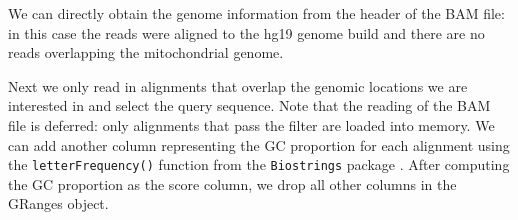\documentclass[]{article}
\newenvironment{Shaded}{\begin{snugshade}}{\end{snugshade}}
\newcommand{\DataTypeTok}[1]{\textcolor[rgb]{0.13,0.29,0.53}{#1}}
\newcommand{\KeywordTok}[1]{\textcolor[rgb]{0.13,0.29,0.53}{\textbf{#1}}}
\newcommand{\NormalTok}[1]{#1}
\newcommand{\OperatorTok}[1]{\textcolor[rgb]{0.81,0.36,0.00}{\textbf{#1}}}
\newcommand{\OtherTok}[1]{\textcolor[rgb]{0.56,0.35,0.01}{#1}}
\newcommand{\StringTok}[1]{\textcolor[rgb]{0.31,0.60,0.02}{#1}}
\begin{document}
We can directly obtain the genome information from the header of the BAM
file: in this case the reads were aligned to the hg19 genome build and
there are no reads overlapping the mitochondrial genome.

\begin{Shaded}
\end{Shaded}

Next we only read in alignments that overlap the genomic locations we
are interested in and select the query sequence. Note that the reading
of the BAM file is deferred: only alignments that pass the filter are
loaded into memory. We can add another column representing the GC
proportion for each alignment using the \texttt{letterFrequency()}
function from the \texttt{Biostrings} package \cite{R-biostrings}. After
computing the GC proportion as the score column, we drop all other
columns in the GRanges object.

\begin{Shaded}
\end{Shaded}
\end{document}
